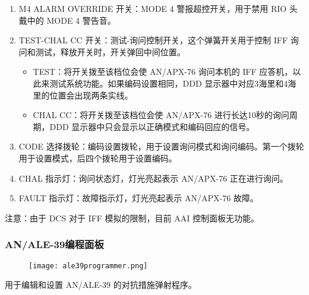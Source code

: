 \begin{enumerate}
	\item M4 ALARM OVERRIDE 开关：MODE 4 警报超控开关，用于禁用 RIO 头戴中的 MODE 4 警告音。
	\item TEST-CHAL CC 开关：测试-询问控制开关，这个弹簧开关用于控制 IFF 询问和测试，释放开关时，开关弹回中间位置。
	      \begin{itemize}
		      \item TEST：将开关拨至该档位会使 AN/APX-76 询问本机的 IFF 应答机，以此来测试系统功能。如果编码设置相同，DDD 显示器中对应3海里和4海里的位置会出现两条实线。
		      \item CHAL CC：将开关拨至该档位会使 AN/APX-76 进行长达10秒的询问周期，DDD 显示器中只会显示以正确模式和编码回应的信号。
	      \end{itemize}
	\item CODE 选择拨轮：编码设置拨轮，用于设置询问模式和询问编码。第一个拨轮用于设置模式，后四个拨轮用于设置编码。
	\item CHAL 指示灯：询问状态灯，灯光亮起表示 AN/APX-76 正在进行询问。
	\item FAULT 指示灯：故障指示灯，灯光亮起表示 AN/APX-76 故障。
\end{enumerate}
注意：由于 DCS 对于 IFF 模拟的限制，目前 AAI 控制面板无功能。

\subsubsection{AN/ALE-39编程面板}
\begin{figure}[htb]
	\centering
	\texttt{[image: ale39programmer.png]}
\end{figure}
用于编辑和设置 AN/ALE-39 的对抗措施弹射程序。

